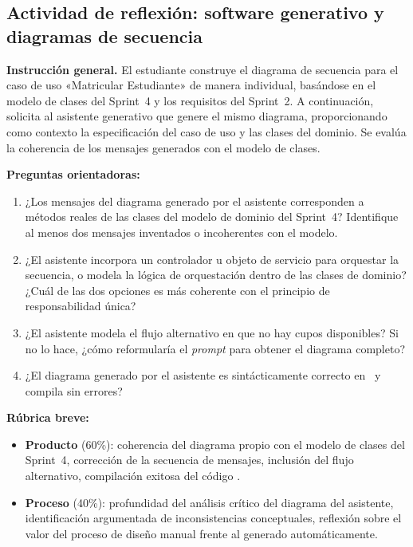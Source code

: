 \subsection*{Actividad de reflexión: software generativo y diagramas de secuencia}
\label{act:ia-sprint5}

\begin{tcolorbox}[actividadIA,
  title={Actividad de reflexión (Sprint~5) —
         Software generativo y diagramas de secuencia}]

\textbf{Instrucción general.}
El estudiante construye el diagrama de secuencia para el caso de uso
«Matricular Estudiante» de manera individual, basándose en el modelo
de clases del Sprint~4 y los requisitos del Sprint~2. A continuación,
solicita al asistente generativo que genere el mismo diagrama, proporcionando
como contexto la especificación del caso de uso y las clases del dominio.
Se evalúa la coherencia de los mensajes generados con el modelo de clases.

\bigskip
\textbf{Preguntas orientadoras:}
\begin{enumerate}[label=\arabic*.]
  \item ¿Los mensajes del diagrama generado por el asistente corresponden
        a métodos reales de las clases del modelo de dominio del Sprint~4?
        Identifique al menos dos mensajes inventados o incoherentes con
        el modelo.
  \item ¿El asistente incorpora un controlador u objeto de servicio para
        orquestar la secuencia, o modela la lógica de orquestación dentro
        de las clases de dominio? ¿Cuál de las dos opciones es más coherente
        con el principio de responsabilidad única?
  \item ¿El asistente modela el flujo alternativo en que no hay cupos
        disponibles? Si no lo hace, ¿cómo reformularía el \textit{prompt}
        para obtener el diagrama completo?
  \item ¿El diagrama generado por el asistente es sintácticamente correcto
        en \plantuml\ y compila sin errores?
\end{enumerate}

\bigskip
\textbf{Rúbrica breve:}
\begin{itemize}
  \item \textbf{Producto} (60\%): coherencia del diagrama propio con el
        modelo de clases del Sprint~4, corrección de la secuencia de
        mensajes, inclusión del flujo alternativo, compilación exitosa
        del código \plantuml.
  \item \textbf{Proceso} (40\%): profundidad del análisis crítico del
        diagrama del asistente, identificación argumentada de
        inconsistencias conceptuales, reflexión sobre el valor del
        proceso de diseño manual frente al generado automáticamente.
\end{itemize}

\end{tcolorbox}
